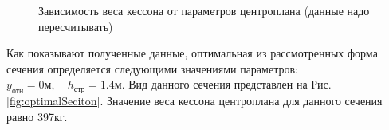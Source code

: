 \begin{figure}[H]
\captionsetup{justification=centering}
\caption{Зависимость веса кессона от параметров центроплана (данные надо пересчитывать)}
\def\svgwidth{\textwidth}

\label{fig:Optimization3dplot}
\end{figure}

Как показывают полученные данные, оптимальная из рассмотренных форма сечения определяется следующими значениями параметров: $y_\text{отн} = 0\text{м},\quad h_\text{стр}=1.4\text{м}$. Вид данного сечения представлен на Рис.\ref{fig:optimalSeciton}. Значение веса кессона центроплана для данного сечения равно 397кг. 